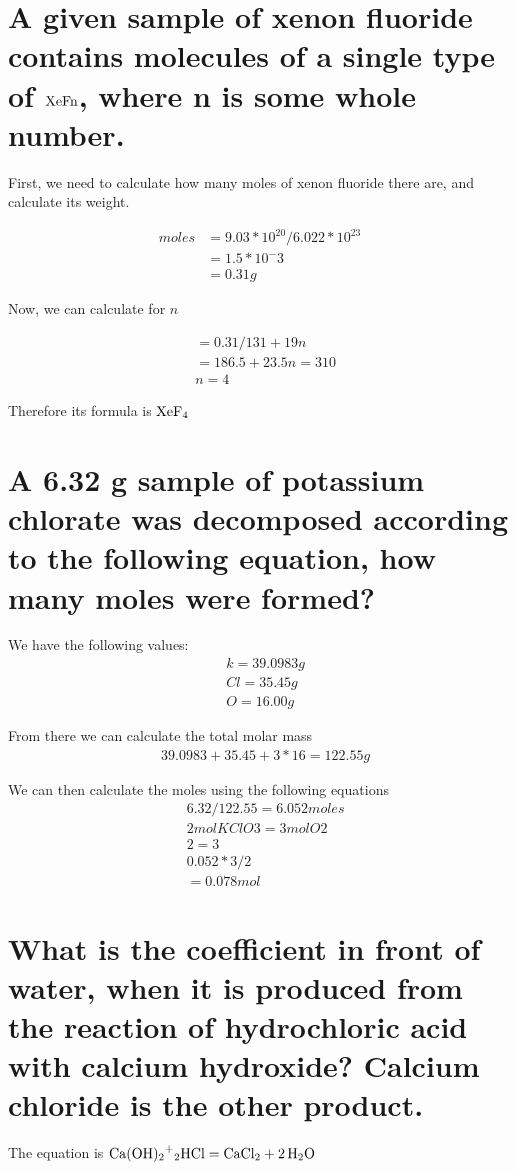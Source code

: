 \documentclass{scrartcl}
\begin{document}
\section{A given sample of xenon fluoride contains molecules of a single type of \(\ce{XeFn}\), where n is some whole number.}
\label{sec:org607852a}
First, we need to calculate how many moles of xenon fluoride there are, and
calculate its weight.

\begin{align*}
moles&=9.03*10^{20}/6.022*10^{23}\\
&= 1.5*10^-3\\
&= 0.31g
\end{align*}

Now, we can calculate for \(n\)

\begin{align*}
&= 0.31/131+19n\\
&= 186.5 + 23.5n = 310\\
&n = 4
\end{align*}

Therefore its formula is \(\ce{XeF4}\)

\section{A 6.32 g sample of potassium chlorate was decomposed according to the following equation, how many moles were formed?}
\label{sec:orgb35c5f0}
We have the following values:
\begin{align*}
&k = 39.0983g\\
&Cl = 35.45g\\
&O = 16.00g
\end{align*}

From there we can calculate the total molar mass
\begin{align*}
&39.0983 + 35.45 + 3*16 = 122.55g
\end{align*}

We can then calculate the moles using the following equations
\begin{align*}
&6.32/122.55 = 6.052 moles\\
&2 mol KClO3 = 3 mol O2\\
&2 = 3\\
&0.052*3/2\\
&= 0.078 mol
\end{align*}

\section{What is the coefficient in front of water, when it is produced from the reaction of hydrochloric acid with calcium hydroxide? Calcium chloride is the other product.}
\label{sec:org89b307d}
The equation is
\(\ce{Ca(OH)2+2HCl}=\ce{CaCl2 + 2H2O}\)
\end{document}
